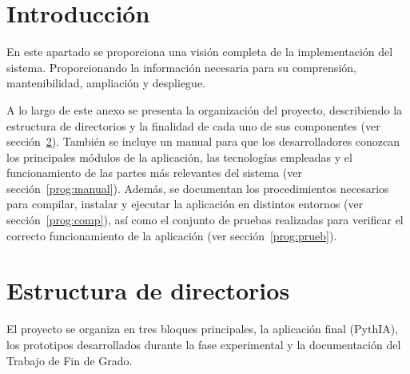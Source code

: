 
\section{Introducción}

En este apartado se proporciona una visión completa de la implementación del sistema. Proporcionando la información necesaria para su comprensión, mantenibilidad, ampliación y despliegue.

A lo largo de este anexo se presenta la organización del proyecto, describiendo la estructura de directorios y la finalidad de cada uno de sus componentes (ver sección~\ref{prog:dir}). También se incluye un manual para que los desarrolladores conozcan los principales módulos de la aplicación, las tecnologías empleadas y el funcionamiento de las partes más relevantes del sistema (ver sección~\ref{prog:manual}). Además, se documentan los procedimientos necesarios para compilar, instalar y ejecutar la aplicación en distintos entornos (ver sección~\ref{prog:comp}), así como el conjunto de pruebas realizadas para verificar el correcto funcionamiento de la aplicación (ver sección~\ref{prog:prueb}).

\section{Estructura de directorios}
\label{prog:dir}

El proyecto se organiza en tres bloques principales, la aplicación final (PythIA), los prototipos desarrollados durante la fase experimental y la documentación del Trabajo de Fin de Grado.

\vspace{0.5cm} 
{\footnotesize
{}}

